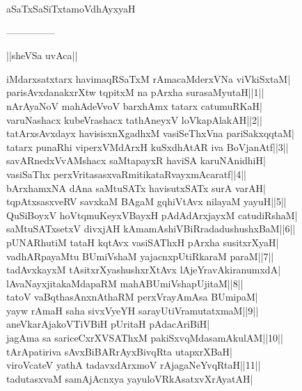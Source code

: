 \documentclass{article}
\begin{document}
\begin{center}
aSaTxSaSiTxtamoVdhAyxyaH
\end{center}

\begin{center}
---------------
\end{center}

\begin{center}
||sheVSa uvAca||
\end{center}

iMdarxsatxtarx havimaqRSaTxM rAmacaMderxVNa viVkiSxtaM|\\
parisAvxdanakxrXtw tqpitxM na pArxha surasaMyutaH||1||\\
nArAyaNoV mahAdeVvoV barxhAmx tatarx catumuRKaH|\\
varuNashacx kubeVrashacx tathAneyxV loVkapAlakAH||2||\\
tatArxsAvxdayx havisisxnXgadhxM vasiSeThxVna pariSakxqqtaM|\\
tatarx punaRhi viperxVMdArxH kuSxdhAtAR iva BoVjanAtf||3||\\
savARnedxVvAMshacx saMtapayxR haviSA karuNAnidhiH|\\
vasiSaThx perxVritasasxvaRmitikataRvayxmAcaratf||4||\\
bArxhamxNA dAna saMtuSATx havisutxSATx surA varAH|\\
tqpAtxsasxveRV savxkaM BAgaM gqhiVtAvx nilayaM yayuH||5||\\
QuSiBoyxV hoVtqmuKeyxVBayxH pAdAdArxjayxM catudiRshaM|\\
saMtuSATxsetxV divxjAH kAmamAshiVBiRradadushushxBaM||6||\\
pUNARhutiM tataH kqtAvx vasiSAThxH pArxha susitxrXyaH|\\
vadhARpayaMtu BUmiVshaM yajacnxpUtiRkaraM paraM||7||\\
tadAvxkayxM tAsitxrXyashushxrXtAvx lAjeYravAkiranumxdA|\\
lAvaNayxjitakaMdapaRM mahABUmiVshapUjitaM||8||\\
tatoV vaBqthasAnxnAthaRM perxVrayAmAsa BUmipaM|\\
yayw rAmaH saha sivxVyeYH sarayUtiVramutatxmaM||9||\\
aneVkarAjakoVTiVBiH pUritaH pAdacAriBiH|\\
jagAma sa sariceCxrXVSAThxM pakiSxvqMdasamAkulAM||10||\\
tArApatiriva sAvxBiBARrAyxBivqRta utapxrXBaH|\\
viroVcateV yathA tadavxdArxmoV rAjagaNeYvqRtaH||11||\\
tadutasxvaM samAjAcnxya yayuloVRkAsatxvXrAyatAH|\\
\end{document}
